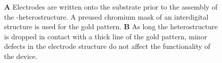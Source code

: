 \begin{figure}
\centering
\begin{subfigure}{0.4\textwidth}
	\caption{}

\end{subfigure}
\begin{subfigure}{0.4\textwidth}
	\caption{}
\end{subfigure}
\caption{\textbf{A} Electrodes are written onto the substrate prior to the assembly of the \hbn-\tmdg heterostructure. A preused chromium mask of an interdigital structure is used for the gold pattern. \textbf{B} As long the heterostructure is dropped in contact with a thick line of the gold pattern, minor defects in the electrode structure do not affect the functionality of the device.}
	\label{pattern}
\end{figure}

